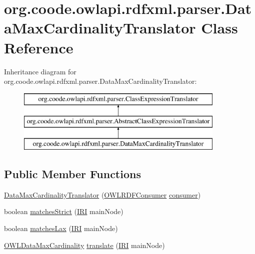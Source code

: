 \hypertarget{classorg_1_1coode_1_1owlapi_1_1rdfxml_1_1parser_1_1_data_max_cardinality_translator}{\section{org.\-coode.\-owlapi.\-rdfxml.\-parser.\-Data\-Max\-Cardinality\-Translator Class Reference}
\label{classorg_1_1coode_1_1owlapi_1_1rdfxml_1_1parser_1_1_data_max_cardinality_translator}
}
Inheritance diagram for org.\-coode.\-owlapi.\-rdfxml.\-parser.\-Data\-Max\-Cardinality\-Translator\-:\begin{figure}[H]
\begin{center}
\leavevmode
\includegraphics[height=3.000000cm]{classorg_1_1coode_1_1owlapi_1_1rdfxml_1_1parser_1_1_data_max_cardinality_translator}
\end{center}
\end{figure}
\subsection*{Public Member Functions}
\begin{DoxyCompactItemize}
\item 
\hyperlink{classorg_1_1coode_1_1owlapi_1_1rdfxml_1_1parser_1_1_data_max_cardinality_translator_aec129af23fff224ff124105df1017fc3}{Data\-Max\-Cardinality\-Translator} (\hyperlink{classorg_1_1coode_1_1owlapi_1_1rdfxml_1_1parser_1_1_o_w_l_r_d_f_consumer}{O\-W\-L\-R\-D\-F\-Consumer} \hyperlink{classorg_1_1coode_1_1owlapi_1_1rdfxml_1_1parser_1_1_abstract_class_expression_translator_ae547084cdd5b92c03835b5aa404f823b}{consumer})
\item 
boolean \hyperlink{classorg_1_1coode_1_1owlapi_1_1rdfxml_1_1parser_1_1_data_max_cardinality_translator_ae009f9f2173423ac205e2e7ca3fcd1a3}{matches\-Strict} (\hyperlink{classorg_1_1semanticweb_1_1owlapi_1_1model_1_1_i_r_i}{I\-R\-I} main\-Node)
\item 
boolean \hyperlink{classorg_1_1coode_1_1owlapi_1_1rdfxml_1_1parser_1_1_data_max_cardinality_translator_ac8f8741e26e34a6cff77a07be099c07e}{matches\-Lax} (\hyperlink{classorg_1_1semanticweb_1_1owlapi_1_1model_1_1_i_r_i}{I\-R\-I} main\-Node)
\item 
\hyperlink{interfaceorg_1_1semanticweb_1_1owlapi_1_1model_1_1_o_w_l_data_max_cardinality}{O\-W\-L\-Data\-Max\-Cardinality} \hyperlink{classorg_1_1coode_1_1owlapi_1_1rdfxml_1_1parser_1_1_data_max_cardinality_translator_af4bbd954f2b86850793d7ec6d8b66759}{translate} (\hyperlink{classorg_1_1semanticweb_1_1owlapi_1_1model_1_1_i_r_i}{I\-R\-I} main\-Node)
\end{DoxyCompactItemize}
